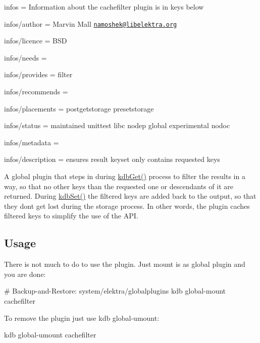 
\begin{DoxyItemize}
\item infos = Information about the cachefilter plugin is in keys below
\item infos/author = Marvin Mall \href{mailto:namoshek@libelektra.org}{\tt namoshek@libelektra.\+org}
\item infos/licence = B\+SD
\item infos/needs =
\item infos/provides = filter
\item infos/recommends =
\item infos/placements = postgetstorage presetstorage
\item infos/status = maintained unittest libc nodep global experimental nodoc
\item infos/metadata =
\item infos/description = ensures result keyset only contains requested keys
\end{DoxyItemize}

A global plugin that steps in during {\ttfamily \hyperlink{group__kdb_ga28e385fd9cb7ccfe0b2f1ed2f62453a1}{kdb\+Get()}} process to filter the results in a way, so that no other keys than the requested one or descendants of it are returned. During {\ttfamily \hyperlink{group__kdb_ga11436b058408f83d303ca5e996832bcf}{kdb\+Set()}} the filtered keys are added back to the output, so that they don\textquotesingle{}t get lost during the storage process. In other words, the plugin caches filtered keys to simplify the use of the A\+PI.

\subsection*{Usage}

There is not much to do to use the plugin. Just mount is as global plugin and you are done\+:


\begin{DoxyCode}
# Backup-and-Restore: system/elektra/globalplugins
kdb global-mount cachefilter
\end{DoxyCode}


To remove the plugin just use {\ttfamily kdb global-\/umount}\+:


\begin{DoxyCode}
kdb global-umount cachefilter
\end{DoxyCode}
 